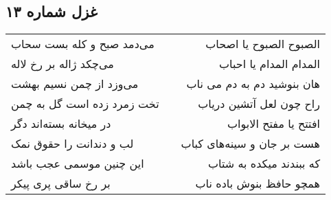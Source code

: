 \begin{center}
\section*{غزل شماره ۱۳}
\label{sec:sh013}
\begin{longtable}{l p{0.5cm} r}
می‌دمد صبح و کله بست سحاب
&&
الصبوح الصبوح یا اصحاب
\\
می‌چکد ژاله بر رخ لاله
&&
المدام المدام یا احباب
\\
می‌وزد از چمن نسیم بهشت
&&
هان بنوشید دم به دم می ناب
\\
تخت زمرد زده است گل به چمن
&&
راح چون لعل آتشین دریاب
\\
در میخانه بسته‌اند دگر
&&
افتتح یا مفتح الابواب
\\
لب و دندانت را حقوق نمک
&&
هست بر جان و سینه‌های کباب
\\
این چنین موسمی عجب باشد
&&
که ببندند میکده به شتاب
\\
بر رخ ساقی پری پیکر
&&
همچو حافظ بنوش باده ناب
\\
\end{longtable}
\end{center}
